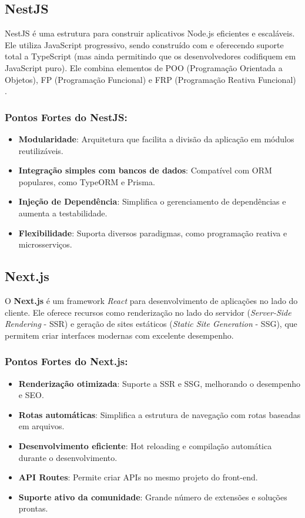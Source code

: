 \subsection{NestJS}

NestJS é uma estrutura para construir aplicativos Node.js eficientes e escaláveis. Ele utiliza JavaScript progressivo, sendo construído com e oferecendo suporte total a TypeScript (mas ainda permitindo que os desenvolvedores codifiquem em JavaScript puro). Ele combina elementos de POO (Programação Orientada a Objetos), FP (Programação Funcional) e FRP (Programação Reativa Funcional) \cite{nestjs2025}.

\subsubsection*{Pontos Fortes do NestJS:}
\begin{itemize}
    \item \textbf{Modularidade}: Arquitetura que facilita a divisão da aplicação em módulos reutilizáveis.
    \item \textbf{Integração simples com bancos de dados}: Compatível com ORM populares, como TypeORM e Prisma.
    \item \textbf{Injeção de Dependência}: Simplifica o gerenciamento de dependências e aumenta a testabilidade.
    \item \textbf{Flexibilidade}: Suporta diversos paradigmas, como programação reativa e microsserviços.
\end{itemize}

\subsection{Next.js}

O \textbf{Next.js} é um framework \textit{React} para desenvolvimento de aplicações no lado do cliente. Ele oferece recursos como renderização no lado do servidor (\textit{Server-Side Rendering} - SSR) e geração de sites estáticos (\textit{Static Site Generation} - SSG), que permitem criar interfaces modernas com excelente desempenho.

\subsubsection*{Pontos Fortes do Next.js:}
\begin{itemize}
    \item \textbf{Renderização otimizada}: Suporte a SSR e SSG, melhorando o desempenho e SEO.
    \item \textbf{Rotas automáticas}: Simplifica a estrutura de navegação com rotas baseadas em arquivos.
    \item \textbf{Desenvolvimento eficiente}: Hot reloading e compilação automática durante o desenvolvimento.
    \item \textbf{API Routes}: Permite criar APIs no mesmo projeto do front-end.
    \item \textbf{Suporte ativo da comunidade}: Grande número de extensões e soluções prontas.
\end{itemize}

